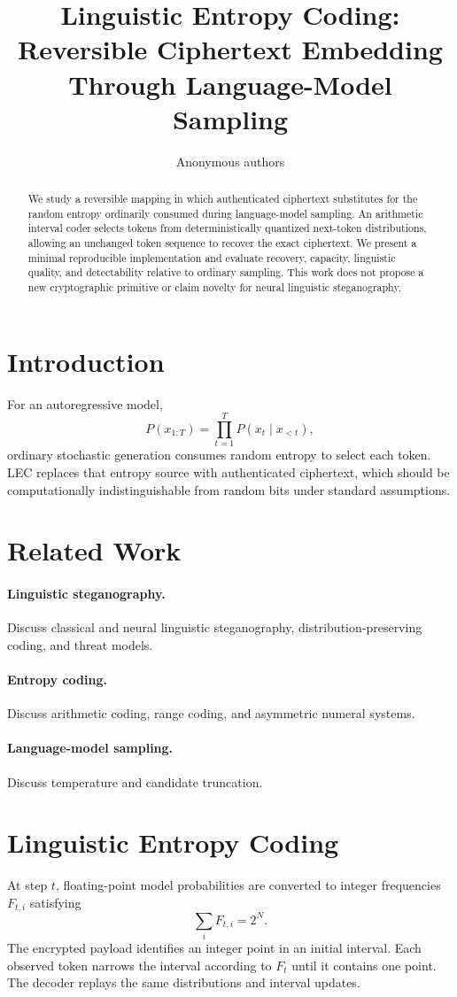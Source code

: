 \documentclass[10pt]{article}
\title{Linguistic Entropy Coding: Reversible Ciphertext Embedding Through
Language-Model Sampling}
\author{Anonymous authors}
\date{}
\begin{document}
\maketitle

\begin{abstract}
We study a reversible mapping in which authenticated ciphertext substitutes
for the random entropy ordinarily consumed during language-model sampling.
An arithmetic interval coder selects tokens from deterministically quantized
next-token distributions, allowing an unchanged token sequence to recover the
exact ciphertext. We present a minimal reproducible implementation and evaluate
recovery, capacity, linguistic quality, and detectability relative to ordinary
sampling. This work does not propose a new cryptographic primitive or claim
novelty for neural linguistic steganography.
\end{abstract}

\section{Introduction}
For an autoregressive model,
\[
  P(x_{1:T})=\prod_{t=1}^{T}P(x_t\mid x_{<t}),
\]
ordinary stochastic generation consumes random entropy to select each token.
LEC replaces that entropy source with authenticated ciphertext, which should be
computationally indistinguishable from random bits under standard assumptions.

\section{Related Work}
\paragraph{Linguistic steganography.}
Discuss classical and neural linguistic steganography, distribution-preserving
coding, and threat models.
\paragraph{Entropy coding.}
Discuss arithmetic coding, range coding, and asymmetric numeral systems.
\paragraph{Language-model sampling.}
Discuss temperature and candidate truncation.

\section{Linguistic Entropy Coding}
At step $t$, floating-point model probabilities are converted to integer
frequencies $F_{t,i}$ satisfying
\[
  \sum_i F_{t,i}=2^N.
\]
The encrypted payload identifies an integer point in an initial interval. Each
observed token narrows the interval according to $F_t$ until it contains one
point. The decoder replays the same distributions and interval updates.
\end{document}
